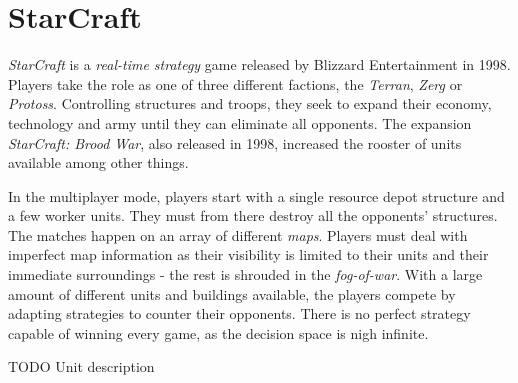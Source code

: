 \chapter{StarCraft}
\emph{StarCraft} is a \emph{real-time strategy} game released by Blizzard Entertainment in 1998. Players take the role as one of three different factions, the \emph{Terran}, \emph{Zerg} or \emph{Protoss}. Controlling structures and troops, they seek to expand their economy, technology and army until they can eliminate all opponents. The expansion \emph{StarCraft: Brood War}, also released in 1998, increased the rooster of units available among other things.

In the multiplayer mode, players start with a single resource depot structure and a few worker units. They must from there destroy all the opponents' structures. The matches happen on an array of different \emph{maps}. Players must deal with imperfect map information as their visibility is limited to their units and their immediate surroundings - the rest is shrouded in the \emph{fog-of-war}. With a large amount of different units and buildings available, the players compete by adapting strategies to counter their opponents. There is no perfect strategy capable of winning every game, as the decision space is nigh infinite.

TODO Unit description